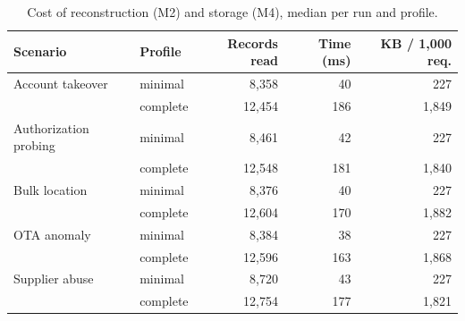 \begin{table}[t]\centering\footnotesize
\caption{Cost of reconstruction (M2) and storage (M4), median per run and profile.}
\label{tab:cost}
\begin{tabular}{@{}p{1.5in}lrrr@{}}\toprule
Scenario & Profile & Records read & Time (ms) & KB / 1,000 req. \\\midrule
Account takeover & minimal & 8,358 & 40 & 227 \\
 & complete & 12,454 & 186 & 1,849 \\
Authorization probing & minimal & 8,461 & 42 & 227 \\
 & complete & 12,548 & 181 & 1,840 \\
Bulk location & minimal & 8,376 & 40 & 227 \\
 & complete & 12,604 & 170 & 1,882 \\
OTA anomaly & minimal & 8,384 & 38 & 227 \\
 & complete & 12,596 & 163 & 1,868 \\
Supplier abuse & minimal & 8,720 & 43 & 227 \\
 & complete & 12,754 & 177 & 1,821 \\
\bottomrule\end{tabular}\end{table}
